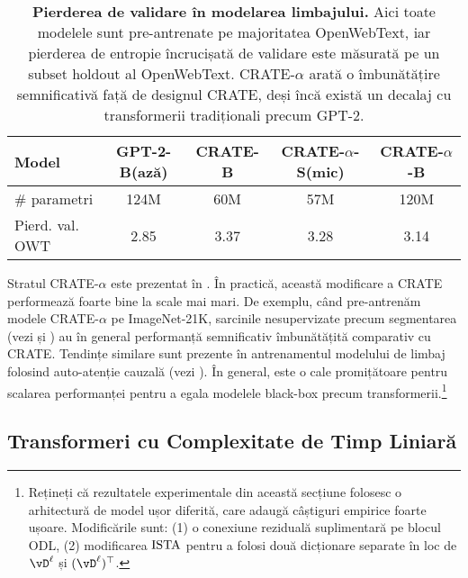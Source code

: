 \documentclass[../../book-main_ro.tex]{subfiles}
\begin{document}
\begin{table}
    \centering 
    \begin{tabular}{@{}lcccc@{}}
    \toprule
    Model & GPT-2-B(ază) & CRATE-B & CRATE-\(\alpha\)-S(mic) & CRATE-\(\alpha\)-B \\ 
    \midrule
    \midrule
    \# parametri & 124M & 60M & 57M & 120M \\
    Pierd. val. OWT & 2.85 & 3.37 & 3.28 & 3.14 \\
    \bottomrule
    \end{tabular}
    \caption{\small\textbf{Pierderea de validare în modelarea limbajului.} Aici toate modelele sunt pre-antrenate pe majoritatea OpenWebText, iar pierderea de entropie încrucișată de validare este măsurată pe un subset holdout al OpenWebText. CRATE-\(\alpha\) arată o îmbunătățire semnificativă față de designul CRATE, deși încă există un decalaj cu transformerii tradiționali precum GPT-2.}
    \label{tab:crate_alpha_lm}
\end{table}

Stratul CRATE-\(\alpha\) este prezentat în . În practică, această modificare a CRATE performează foarte bine la scale mai mari. De exemplu, când pre-antrenăm modele CRATE-\(\alpha\) pe ImageNet-21K, sarcinile nesupervizate precum segmentarea (vezi  și ) au în general performanță semnificativ îmbunătățită comparativ cu CRATE. Tendințe similare sunt prezente în antrenamentul modelului de limbaj folosind auto-atenție cauzală (vezi ). În general, este o cale promițătoare pentru scalarea performanței pentru a egala modelele black-box precum transformerii.\footnote{Rețineți că rezultatele experimentale din această secțiune folosesc o arhitectură de model ușor diferită, care adaugă câștiguri empirice foarte ușoare. Modificările sunt: (1) o conexiune reziduală suplimentară pe blocul ODL, (2) modificarea \(\operatorname{ISTA}\) pentru a folosi două dicționare separate în loc de \(\vD^{\ell}\) și \((\vD^{\ell})^{\top}\).}


\subsection{Transformeri cu Complexitate de Timp Liniară}\label{sub:tost_experiments}
\end{document}

